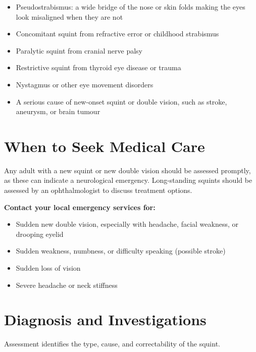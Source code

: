 \begin{itemize}
    \item Pseudostrabismus: a wide bridge of the nose or skin folds making the eyes look misaligned when they are not
    \item Concomitant squint from refractive error or childhood strabismus
    \item Paralytic squint from cranial nerve palsy
    \item Restrictive squint from thyroid eye disease or trauma
    \item Nystagmus or other eye movement disorders
    \item A serious cause of new-onset squint or double vision, such as stroke, aneurysm, or brain tumour
\end{itemize}

\section*{When to Seek Medical Care}
Any adult with a new squint or new double vision should be assessed promptly, as these can indicate a neurological emergency. Long-standing squints should be assessed by an ophthalmologist to discuss treatment options.

\textbf{Contact your local emergency services for:}
\begin{itemize}
    \item Sudden new double vision, especially with headache, facial weakness, or drooping eyelid
    \item Sudden weakness, numbness, or difficulty speaking (possible stroke)
    \item Sudden loss of vision
    \item Severe headache or neck stiffness
\end{itemize}

\section*{Diagnosis and Investigations}
Assessment identifies the type, cause, and correctability of the squint.


